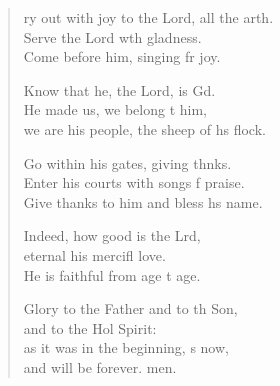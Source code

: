 \settowidth{\versewidth}{Cry out with joy to the Lord, all the earth. +}
\begin{verse}%
  \begin{patverse}
ry out with joy to the Lord, all the arth.\Flex\\
Serve the Lord w\pointup{\i}th gladness.\Med\\
Come before him, singing fr joy.

Know that he, the Lord, is Gd.\Flex\\
He made us, we belong t him,\Med\\
we are his people, the sheep of h\pointup{\i}s flock.

Go within his gates, giving thnks.\Flex\\
Enter his courts with songs f praise.\Med\\
Give thanks to him and bless h\pointup{\i}s name.

Indeed, how good is the Lrd,\Flex\\
eternal his mercifl love.\Med\\
He is faithful from age t age.

Glory to the Father and to th Son,\Med\\
and to the Hol Spirit:\\
as it was in the beginning, \pointup{\i}s now,\Med\\
and will be forever. men.
  \end{patverse}
\end{verse}
